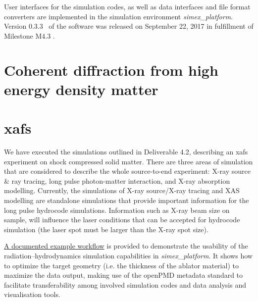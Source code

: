 \documentclass[10pt]{scrartcl}
\begin{document}
User interfaces for the simulation codes, as well
as data interfaces and file format converters are implemented in the simulation
environment \textit{simex\_platform}. Version 0.3.3~\cite{simex0.3.3} of the
software was released on September 22, 2017 in fulfillment of Milestone M4.3
\cite{EUCALL_SIMEX_M4.3}.
%
\section{Coherent diffraction from high energy density matter}\label{sec:plasma_diffraction}

\FloatBarrier
%
\section{\Gls{xafs}\label{sec:xafs}}
%
We have executed the simulations outlined in Deliverable
4.2\cite{EUCALL_SIMEX_D4.2}, describing an \gls{xafs} experiment on shock compressed
solid matter. There are three areas of simulation that are considered to describe the
whole source-to-end experiment: X-ray source \& ray tracing, long pulse photon-matter
interaction, and X-ray absorption modelling. Currently, the simulations of X-ray
source/X-ray tracing and XAS modelling are standalone simulations that provide
important information for the long pulse hydrocode simulations. Information
such as X-ray beam size on sample, will influence the laser conditions that can
be accepted for hydrocode simulation (the laser spot must be larger than the
X-ray spot size).



\href{https://www.github.com/eucall-software/simex_platform/wiki/Esther-Hydrocode-Tutorial}{A
documented example workflow} is provided to demonstrate the usability of the
radiation--hydrodynamics simulation capabilities in \textit{simex\_platform}. It
shows how to optimize the target geometry (i.e. the thickness of the ablator
material) to maximize the data output, making use of the openPMD metadata
standard to facilitate transferability among involved simulation codes and
data analysis and visualisation tools.
\FloatBarrier
%
\end{document}
